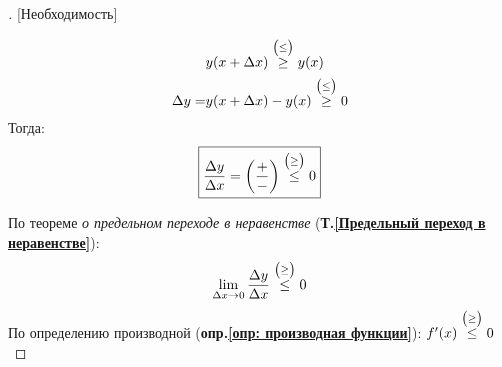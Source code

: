 \begin{proof}[][Необходимость]
\begin{enumerate}
\begin{align*}
			                 & y(x+\Delta x) \overset{\scriptsize{\big(\le \big)}}{\ge} y(x)       \\
			      \Delta y = & y(x + \Delta x) - y(x) \overset{\scriptsize{\big(\le \big)}}{\ge} 0
		      \end{align*} \vspace{-\topsep}
		      Тогда:
		      \begin{gather*}
			      \boxed{\frac{\Delta y}{\Delta x} = \left(\frac{+}{-}\right) \overset{\scriptsize{\big(\ge \big)}}{\le} 0}
		      \end{gather*}
	\end{enumerate}
	По теореме \textit{о предельном переходе в неравенстве} (\textbf{Т.\ref{Предельный переход в неравенстве}}):
	\begin{gather*}
		\lim\limits_{\Delta x \to 0} \frac{\Delta y}{\Delta x} \overset{\scriptsize{\big(\ge \big)}}{\le} 0
	\end{gather*}
	По определению производной (\textbf{опр.\ref{опр: производная функции}}): $f'(x) \overset{\scriptsize{\big(\ge \big)}}{\le} 0$
\end{proof}
